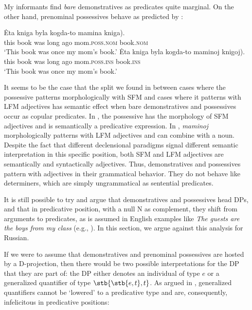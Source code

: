 \documentclass[output=paper,
colorlinks,
citecolor=brown,
newtxmath
]{langscibook}
\begin{document}
My informants find \textit{bare} demonstratives as predicates quite marginal. On the other hand, prenominal possessives behave as predicted by \citet{Partee.Borschev2003}:


\ea
    \ea \gll Ėta kniga byla kogda-to mamina \minsp{(*} kniga).\label{maminakniga}\\
    this book was {long ago} mom.\textsc{poss.nom} {} book.\textsc{nom}\\
    \glt `This book was once my mom's book.'
    \ex \gll Ėta kniga byla kogda-to maminoj \minsp{(} knigoj).\label{maminojknigoj}\\
    this book was {long ago} mom.\textsc{poss.ins} {} book.\textsc{ins}\\
    \glt `This book was once my mom's book.'
\z\z

\noindent It seems to be the case that the split we found in  between cases where the possessive patterns morphologically with SFM and cases where it patterns with LFM adjectives has semantic effect when bare demonstratives and possessives occur as copular predicates. In , the possessive has the morphology of SFM adjectives and is semantically a predicative expression. In , \textit{maminoj} morphologically patterns with LFM adjectives and can combine with a noun. Despite the fact that different declensional paradigms signal different semantic interpretation in this specific position, both SFM and LFM adjectives are semantically and syntactically adjectives. Thus, demonstratives and possessives pattern with adjectives in their grammatical behavior. They do not behave like determiners, which are simply ungrammatical as sentential predicates. 



It is still possible to try and argue that demonstratives and possessives head DPs, and that in predicative position, with a null N as complement, they shift from arguments to predicates, as is assumed in English examples like \textit{The guests are the boys from my class} (e.g., \citealt{Partee1987}). In this section, we argue against this analysis for Russian.

If we were to assume that demonstratives and prenominal possessives are hosted by a D-projection, then there would be two possible interpretations for the DP that they are part of: the DP either denotes an individual of type $e$ or a generalized quantifier of type $\stb{\stb{e,t}, t}$. As argued in \citet{Landman2003}, generalized quantifiers cannot be `lowered' to a predicative type and are, consequently, infelicitous in predicative positions:
\end{document}
